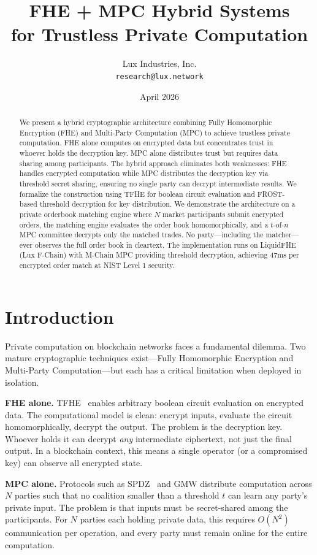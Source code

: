 \documentclass[11pt,a4paper]{article}
\title{FHE + MPC Hybrid Systems\\for Trustless Private Computation}
\author{
Lux Industries, Inc.\\
\texttt{research@lux.network}
}
\date{April 2026}
\begin{document}
\luxcoverpage

\begin{abstract}
We present a hybrid cryptographic architecture combining Fully Homomorphic Encryption (FHE) and Multi-Party Computation (MPC) to achieve trustless private computation. FHE alone computes on encrypted data but concentrates trust in whoever holds the decryption key. MPC alone distributes trust but requires data sharing among participants. The hybrid approach eliminates both weaknesses: FHE handles encrypted computation while MPC distributes the decryption key via threshold secret sharing, ensuring no single party can decrypt intermediate results. We formalize the construction using TFHE for boolean circuit evaluation and FROST-based threshold decryption for key distribution. We demonstrate the architecture on a private orderbook matching engine where $N$ market participants submit encrypted orders, the matching engine evaluates the order book homomorphically, and a $t$-of-$n$ MPC committee decrypts only the matched trades. No party---including the matcher---ever observes the full order book in cleartext. The implementation runs on LiquidFHE (Lux F-Chain) with M-Chain MPC providing threshold decryption, achieving 47ms per encrypted order match at NIST Level 1 security.
\end{abstract}

\section{Introduction}

Private computation on blockchain networks faces a fundamental dilemma. Two mature cryptographic techniques exist---Fully Homomorphic Encryption and Multi-Party Computation---but each has a critical limitation when deployed in isolation.

\textbf{FHE alone.} TFHE~\cite{cggi2020} enables arbitrary boolean circuit evaluation on encrypted data. The computational model is clean: encrypt inputs, evaluate the circuit homomorphically, decrypt the output. The problem is the decryption key. Whoever holds it can decrypt \emph{any} intermediate ciphertext, not just the final output. In a blockchain context, this means a single operator (or a compromised key) can observe all encrypted state.

\textbf{MPC alone.} Protocols such as SPDZ~\cite{spdz2012} and GMW distribute computation across $N$ parties such that no coalition smaller than a threshold $t$ can learn any party's private input. The problem is that inputs must be secret-shared among the participants. For $N$ parties each holding private data, this requires $O(N^2)$ communication per operation, and every party must remain online for the entire computation.
\end{document}
